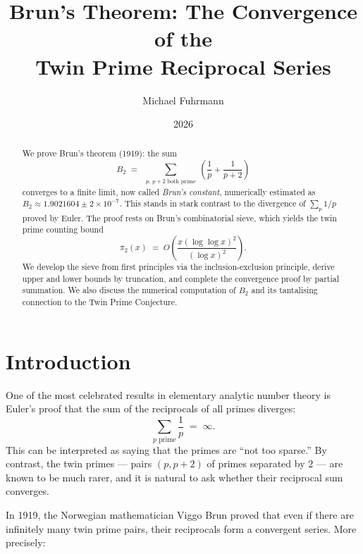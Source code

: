 \documentclass[12pt,a4paper]{amsart}
\theoremstyle{definition}
\begin{document}

\title{Brun's Theorem: The Convergence of the\\Twin Prime Reciprocal Series}

\author{Michael Fuhrmann}
\address{Specialist Mathematics Project, Build 74}
\date{2026}

\begin{abstract}
We prove Brun's theorem (1919): the sum
\[
  B_2 \;=\; \sum_{\substack{p,\,p+2\text{ both prime}}}
             \left(\frac{1}{p}+\frac{1}{p+2}\right)
\]
converges to a finite limit, now called \emph{Brun's constant},
numerically estimated as $B_2 \approx 1.9021604 \pm 2\times 10^{-7}$.
This stands in stark contrast to the divergence of $\sum_{p} 1/p$ proved
by Euler.  The proof rests on Brun's combinatorial sieve, which yields
the twin prime counting bound
\[
  \pi_2(x) \;=\; O\!\left(\frac{x(\log\log x)^2}{(\log x)^2}\right).
\]
We develop the sieve from first principles via the inclusion-exclusion
principle, derive upper and lower bounds by truncation, and complete the
convergence proof by partial summation.  We also discuss the numerical
computation of $B_2$ and its tantalising connection to the Twin Prime
Conjecture.
\end{abstract}

\maketitle
\tableofcontents

\section{Introduction}

One of the most celebrated results in elementary analytic number theory
is Euler's proof that the sum of the reciprocals of all primes diverges:
\[
  \sum_{p \text{ prime}} \frac{1}{p} \;=\; \infty.
\]
This can be interpreted as saying that the primes are ``not too sparse.''
By contrast, the twin primes --- pairs $(p, p+2)$ of primes separated by
$2$ --- are known to be much rarer, and it is natural to ask whether their
reciprocal sum converges.

In 1919, the Norwegian mathematician Viggo Brun proved that even if there
are infinitely many twin prime pairs, their reciprocals form a convergent
series.  More precisely:
\end{document}
